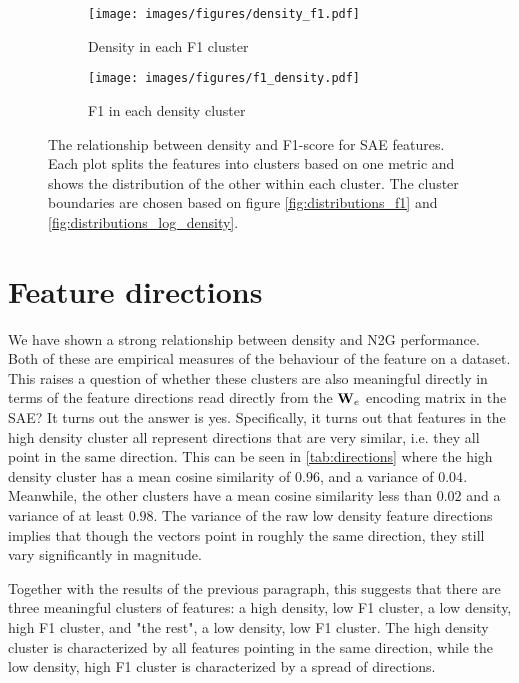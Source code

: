 \begin{figure}[h]
    \centering
    
    \begin{subfigure}[b]{0.45\textwidth}
        \centering
        \texttt{[image: images/figures/density\_f1.pdf]}
        \caption{Density in each F1 cluster}
        \label{fig:density_f1}
    \end{subfigure}
    \begin{subfigure}[b]{0.45\textwidth}
        \centering
        \texttt{[image: images/figures/f1\_density.pdf]}
        \caption{F1 in each density cluster}
        \label{fig:f1_density}
    \end{subfigure}
    
    \caption{The relationship between density and F1-score for SAE features.
    Each plot splits the features into clusters based on one metric and shows the distribution of the other within each cluster.
    The cluster boundaries are chosen based on figure \ref{fig:distributions_f1} and \ref{fig:distributions_log_density}.}
    \label{fig:density_f1_cluster_check}
\end{figure}

\section{Feature directions}
We have shown a strong relationship between density and N2G performance.
Both of these are empirical measures of the behaviour of the feature on a dataset.
This raises a question of whether these clusters are also meaningful directly in terms of the feature directions read directly from the $\mathbf{W}_e$ encoding matrix in the SAE?
It turns out the answer is yes.
Specifically, it turns out that features in the high density cluster all represent directions that are very similar, i.e. they all point in the same direction.
This can be seen in \autoref{tab:directions} where the high density cluster has a mean cosine similarity of $0.96$, and a variance of $0.04$.
Meanwhile, the other clusters have a mean cosine similarity less than $0.02$ and a variance of at least $0.98$.
The variance of the raw low density feature directions implies that though the vectors point in roughly the same direction, they still vary significantly in magnitude.

Together with the results of the previous paragraph, this suggests that there are three meaningful clusters of features: a high density, low F1 cluster, a low density, high F1 cluster, and "the rest", a low density, low F1 cluster.
The high density cluster is characterized by all features pointing in the same direction, while the low density, high F1 cluster is characterized by a spread of directions.

